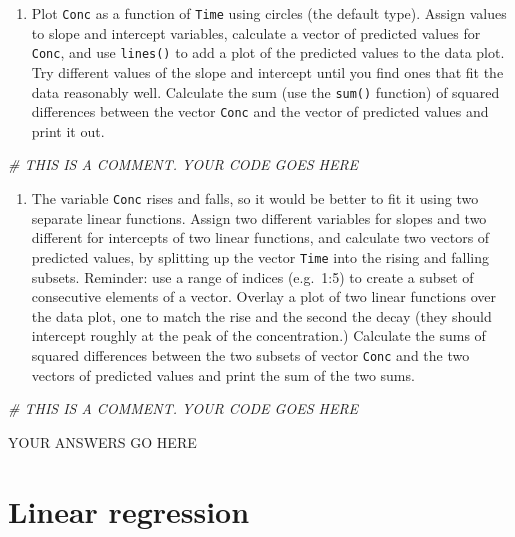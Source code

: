 \documentclass[
]{book}
\newenvironment{Shaded}{\begin{snugshade}}{\end{snugshade}}
\newcommand{\CommentTok}[1]{\textcolor[rgb]{0.56,0.35,0.01}{\textit{#1}}}
\providecommand{\tightlist}{%
  \setlength{\itemsep}{0pt}\setlength{\parskip}{0pt}}
\theoremstyle{definition}
\theoremstyle{definition}
\theoremstyle{definition}
\theoremstyle{remark}
\begin{document}
\begin{enumerate}
\def\labelenumi{\alph{enumi})}
\tightlist
\item
  Plot \texttt{Conc} as a function of \texttt{Time} using circles (the default type). Assign values to slope and intercept variables, calculate a vector of predicted values for \texttt{Conc}, and use \texttt{lines()} to add a plot of the predicted values to the data plot. Try different values of the slope and intercept until you find ones that fit the data reasonably well. Calculate the sum (use the \texttt{sum()} function) of squared differences between the vector \texttt{Conc} and the vector of predicted values and print it out.
\end{enumerate}

\begin{Shaded}
\begin{Highlighting}[]
\CommentTok{\# THIS IS A COMMENT. YOUR CODE GOES HERE }
\end{Highlighting}
\end{Shaded}

\begin{enumerate}
\def\labelenumi{\alph{enumi})}
\setcounter{enumi}{1}
\tightlist
\item
  The variable \texttt{Conc} rises and falls, so it would be better to fit it using two separate linear functions. Assign two different variables for slopes and two different for intercepts of two linear functions, and calculate two vectors of predicted values, by splitting up the vector \texttt{Time} into the rising and falling subsets. Reminder: use a range of indices (e.g.~1:5) to create a subset of consecutive elements of a vector. Overlay a plot of two linear functions over the data plot, one to match the rise and the second the decay (they should intercept roughly at the peak of the concentration.) Calculate the sums of squared differences between the two subsets of vector \texttt{Conc} and the two vectors of predicted values and print the sum of the two sums.
\end{enumerate}

\begin{Shaded}
\begin{Highlighting}[]
\CommentTok{\# THIS IS A COMMENT. YOUR CODE GOES HERE }
\end{Highlighting}
\end{Shaded}

YOUR ANSWERS GO HERE

\hypertarget{linear-regression}{%
\chapter{Linear regression}\label{linear-regression}}
\end{document}
